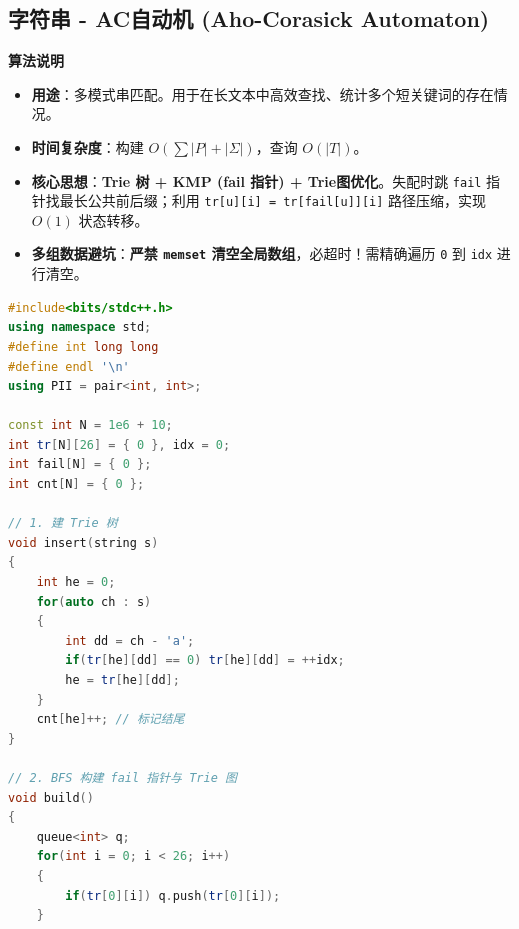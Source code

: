 \documentclass[10pt,landscape,a4paper]{article}
\begin{document}
\begin{multicols*}{3}
\subsection*{字符串 - AC自动机 (Aho-Corasick Automaton)}
\par\addvspace{0.7ex}\noindent\textbf{算法说明}\par\nobreak
\begin{itemize}
\item \textbf{用途}：多模式串匹配。用于在长文本中高效查找、统计多个短关键词的存在情况。
\item \textbf{时间复杂度}：构建 $O(\sum |P| + |\Sigma|)$，查询 $O(|T|)$。
\item \textbf{核心思想}：\textbf{Trie 树 + KMP (fail 指针) + Trie图优化}。失配时跳 \texttt{f\allowbreak{}a\allowbreak{}i\allowbreak{}l} 指针找最长公共前后缀；利用 \texttt{t\allowbreak{}r\allowbreak{}[\allowbreak{}u\allowbreak{}]\allowbreak{}[\allowbreak{}i\allowbreak{}]\allowbreak{} \allowbreak{}=\allowbreak{} \allowbreak{}t\allowbreak{}r\allowbreak{}[\allowbreak{}f\allowbreak{}a\allowbreak{}i\allowbreak{}l\allowbreak{}[\allowbreak{}u\allowbreak{}]\allowbreak{}]\allowbreak{}[\allowbreak{}i\allowbreak{}]} 路径压缩，实现 $O(1)$ 状态转移。
\item \textbf{多组数据避坑}：\textbf{严禁 \texttt{m\allowbreak{}e\allowbreak{}m\allowbreak{}s\allowbreak{}e\allowbreak{}t} 清空全局数组}，必超时！需精确遍历 \texttt{0} 到 \texttt{i\allowbreak{}d\allowbreak{}x} 进行清空。
\end{itemize}
\par{}\par
\begin{lstlisting}[language=C++]
#include<bits/stdc++.h>
using namespace std;
#define int long long
#define endl '\n'
using PII = pair<int, int>;

const int N = 1e6 + 10;
int tr[N][26] = { 0 }, idx = 0;
int fail[N] = { 0 };
int cnt[N] = { 0 };

// 1. 建 Trie 树
void insert(string s)
{
    int he = 0;
    for(auto ch : s)
    {
        int dd = ch - 'a';
        if(tr[he][dd] == 0) tr[he][dd] = ++idx;
        he = tr[he][dd];
    }
    cnt[he]++; // 标记结尾
}

// 2. BFS 构建 fail 指针与 Trie 图
void build()
{
    queue<int> q;
    for(int i = 0; i < 26; i++)
    {
        if(tr[0][i]) q.push(tr[0][i]);
    }


\end{lstlisting}
\end{multicols*}
\end{document}
